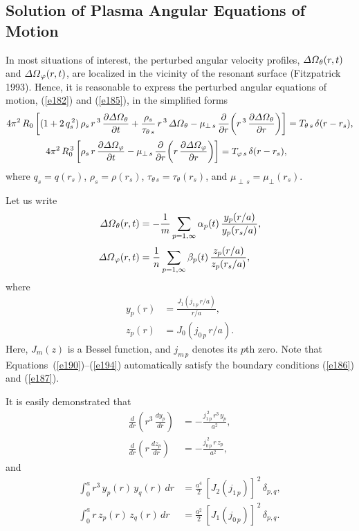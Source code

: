 \documentclass[notitlepage,12pt]{article}
\begin{document}
\subsection{Solution of Plasma Angular Equations of Motion}
In most situations of interest, the perturbed angular velocity profiles, ${\mit\Delta\Omega}_\theta(r,t)$ and ${\mit\Delta\Omega}_\varphi(r,t)$, are
localized in the vicinity of the resonant surface (Fitzpatrick 1993). Hence, it is reasonable to express  the perturbed angular
equations of motion, (\ref{e182}) and (\ref{e185}), in the simplified  forms
\begin{align}\label{e188}
4\pi^2\,R_0\left[(1+2\,q_s^{\,2})\,\rho_s\,r^{\,3}\,\frac{\partial {\mit\Delta\Omega}_\theta}{\partial t}+ \frac{\rho_s}{\tau_{\theta\,s}}\,r^{\,3}\,{\mit\Delta\Omega}_\theta-\mu_{\perp\,s}\,\frac{\partial}{\partial r}\!\left(r^{\,3}\,\frac{\partial{\mit\Delta\Omega}_\theta}{\partial r}\right)\right]
&=T_{\theta\,s}\,\delta(r-r_s),\\[0.5ex]
4\pi^2\,R_0^{\,3}\left[\rho_s\,r\,\frac{\partial {\mit\Delta\Omega}_\varphi}{\partial t}-\mu_{\perp\,s}\,\frac{\partial}{\partial r}\!\left(r\,\frac{\partial{\mit\Delta\Omega}_\varphi}{\partial r}\right)\right]
=T_{\varphi\,s}\,\delta(r-r_s),\label{e189}
\end{align}
where $q_s=q(r_s)$, $\rho_s=\rho(r_s)$, $\tau_{\theta\,s}=\tau_\theta(r_s)$, and $\mu_{\perp\,s}=\mu_\perp(r_s)$. 

Let us write
\begin{align}\label{e190}
{\mit\Delta\Omega}_\theta(r,t) &= - \frac{1}{m}\sum_{p=1,\infty} \alpha_p(t)\,\frac{y_p(r/a)}{y_p(r_s/a)},\\[0.5ex]
{\mit\Delta\Omega}_\varphi(r,t) &=  \frac{1}{n}\sum_{p=1,\infty} \beta_p(t)\,\frac{z_p(r/a)}{z_p(r_s/a)},\label{e191}
\end{align}
where
\begin{align}
y_p(r) &= \frac{J_1(j_{1\,p}\,r/a)}{r/a},\label{e193}\\[0.5ex]
z_p(r) &= J_0(j_{0\,p}\,r/a).\label{e194}
\end{align}
Here, $J_m(z)$ is a Bessel function, and $j_{m\,p}$ denotes its $p$th zero. Note that
Equations~(\ref{e190})--(\ref{e194}) automatically satisfy the boundary conditions (\ref{e186}) and (\ref{e187}). 

It is easily demonstrated that 
\begin{align}
\frac{d}{dr}\!\left(r^{3}\,\frac{dy_p}{dr}\right)&= -\frac{j_{1\,p}^{\,2}\,r^{3}\,y_p}{a^{2}},\\[0.5ex]
\frac{d}{dr}\!\left(r\,\frac{dz_p}{dr}\right)&= -\frac{j_{0\,p}^{\,2}\,r\,z_p}{a^{2}},
\end{align}
and
\begin{align}
\int_0^a r^{3}\,y_p(r)\,y_q(r)\,dr &= \frac{a^{4}}{2}\,[J_2(j_{1\,p})]^{\,2}\,\delta_{p,q},\\[0.5ex]
\int_0^a r\,z_p(r)\,z_q(r)\,dr &= \frac{a^{2}}{2}\,[J_1(j_{0\,p})]^{\,2}\,\delta_{p,q}.\label{e197}
\end{align}
\end{document}
